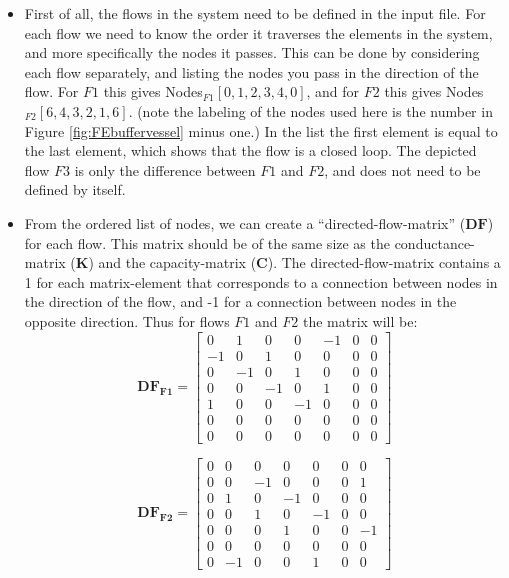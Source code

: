 \begin{itemize}
	\item First of all, the flows in the system need to be defined in the input file. For each flow we need to know the order it traverses the elements in the system, and more specifically the nodes it passes. This can be done by considering each flow separately, and listing the nodes you pass in the direction of the flow.
	For $F1$ this gives Nodes$_{F1}\left[0, 1, 2, 3, 4, 0 \right]$, and for $F2$ this gives Nodes$_{F2}\left[6,4,3,2,1,6\right]$. (note the labeling of the nodes used here is the number in Figure \ref{fig:FEbuffervessel} minus one.) In the list the first element is equal to the last element, which shows that the flow is a closed loop. The depicted flow $F3$ is only the difference between $F1$ and $F2$, and does not need to be defined by itself. 
	\item From the ordered list of nodes, we can create a "`directed-flow-matrix"' ($\mathbf{DF}$) for each flow. This matrix should be of the same size as the conductance-matrix ($\mathbf{K}$) and the capacity-matrix ($\mathbf{C}$).  The directed-flow-matrix contains a 1 for each matrix-element that corresponds to a connection between nodes in the direction of the flow, and -1 for a connection between nodes in the opposite direction. Thus for flows $F1$ and $F2$ the matrix will be:
	\begin{equation}
		\mathbf{DF_{F1}} = \begin{bmatrix}
							0 & 1 & 0 & 0 & -1& 0 & 0 \\
							-1& 0 & 1 & 0 & 0 & 0 & 0 \\
							0 & -1& 0 & 1 & 0 & 0 & 0 \\
							0 & 0 & -1& 0 & 1 & 0 & 0 \\
							1 & 0 & 0 & -1& 0 & 0 & 0 \\
							0 & 0 & 0 & 0 & 0 & 0 & 0 \\
							0 & 0 & 0 & 0 & 0 & 0 & 0 
							\end{bmatrix}
	\label{eq:DFflow1}
	\end{equation}
	
	\begin{equation}
		\mathbf{DF_{F2}} = \begin{bmatrix}
							0 & 0 & 0 & 0 & 0 & 0 & 0 \\
							0 & 0 & -1& 0 & 0 & 0 & 1 \\
							0 & 1 & 0 & -1& 0 & 0 & 0 \\
							0 & 0 & 1 & 0 & -1& 0 & 0 \\
							0 & 0 & 0 & 1 & 0 & 0 & -1 \\
							0 & 0 & 0 & 0 & 0 & 0 & 0 \\
							0 & -1& 0 & 0 & 1 & 0 & 0 
							\end{bmatrix}
	\label{eq:DFflow1}
	\end{equation}
	

\end{itemize}
